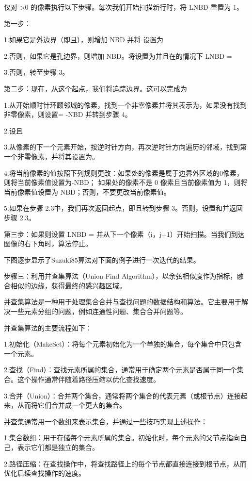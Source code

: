 仅对 >0 的像素执行以下步骤。每次我们开始扫描新行时，将 LNBD 重置为 1。

第一步：

1.如果它是外边界（即且），则增加 NBD 并将 设置为 

2.否则，如果它是孔边界，则增加 NBD。将设置为并且在的情况下 LNBD = 

3.否则，转至步骤 3。

第二步：现在，从这个起点，我们将追踪边界。这可以完成为

1.从开始顺时针环顾邻域的像素，找到一个非零像素并将其表示为，如果没有找到非零像素，则设置= -NBD 并转到步骤 4。

2.设且

3.从像素的下一个元素开始，按逆时针方向，再次逆时针方向遍历的邻域，找到第一个非零像素，并将其设置为。

4.将当前像素的值按照下列规则更改：如果处的像素是属于边界外区域的0像素，则将当前像素值设置为-NBD；
如果处的像素不是 0 像素且当前像素值为 1，则将当前像素值设置为 NBD；否则，不要更改当前像素值。

5.如果在步骤 2.3中，我们再次返回起点，即且转到步骤 3。否则，设置和并返回步骤 2.3。

第三步：如果则设置 LNBD = 并从下一个像素（i，j+1）开始扫描。当我们到达图像的右下角时，算法停止。

下图逐步显示了Suzuki85算法对下面的例子进行一次迭代的结果。

步骤三：利用并查集算法（Union Find Algorithm），以余弦相似度作为指标，融合相似的边缘，获得最终的感兴趣区域。

并查集算法是一种用于处理集合合并与查找问题的数据结构和算法。它主要用于解决一些元素分组的问题，例如连通性问题、集合合并问题等。

并查集算法的主要流程如下：

1.初始化（MakeSet）：将每个元素初始化为一个单独的集合，每个集合中只包含一个元素。

2.查找（Find）：查找元素所属的集合，通常用于确定两个元素是否属于同一个集合。这个操作通常伴随着路径压缩以优化查找速度。

3.合并（Union）：合并两个集合，通常将两个集合的代表元素（或根节点）连接起来，从而将它们合并成一个更大的集合。

并查集通常用一个数组来表示集合，并通过一些技巧实现上述操作：

1.集合数组：用于存储每个元素所属的集合。初始化时，每个元素的父节点指向自己，表示它们都是独立的集合。

2.路径压缩：在查找操作中，将查找路径上的每个节点都直接连接到根节点，从而优化后续查找操作的速度。

